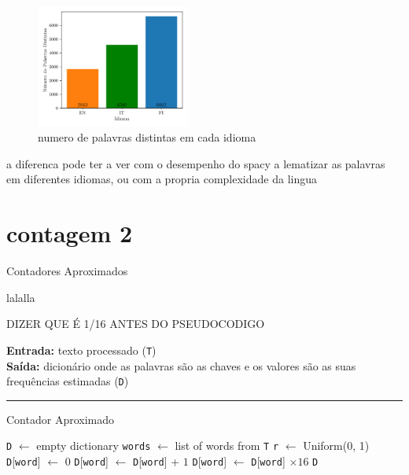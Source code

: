 \documentclass[mirror, portugues]{revdetua}
\begin{document}
\begin{figure}[H]
    \centering
    \includegraphics[width=0.45\textwidth]{../assets/exact_distinct_words.png}
    \caption{numero de palavras distintas em cada idioma}
    \label{fig:distinc_words}
\end{figure}

a diferenca pode ter a ver com o desempenho do spacy a lematizar as palavras em diferentes idiomas, ou com a propria complexidade da lingua 






\section{contagem 2}

Contadores Aproximados 

lalalla

DIZER QUE É 1/16 ANTES DO PSEUDOCODIGO

\begin{algorithm}[H]
\raggedright
\textbf{Entrada:} texto processado (\texttt{T}) \\
\textbf{Saída:} dicionário onde as palavras são as chaves e os valores são as suas frequências estimadas (\texttt{D})\\
\hrule 
\caption{Contador Aproximado}
\begin{algorithmic}[1]
    \State \texttt{D} $\gets$ empty dictionary
    \State \texttt{words} $\gets$ list of words from \texttt{T}
    \State \texttt{r} $\gets$ Uniform(0, 1)
            \State \texttt{D}[\texttt{word}] $\gets$ 0
        \EndIf
        \State \texttt{D}[\texttt{word}] $\gets$ \texttt{D}[\texttt{word}] + $1$
    \EndIf
    \EndFor
     
    \State \texttt{D}[\texttt{word}] $\gets$ \texttt{D}[\texttt{word}] $\times 16$
    \EndFor
    \State \Return \texttt{D}
\end{algorithmic}
\end{algorithm}
\end{document}
